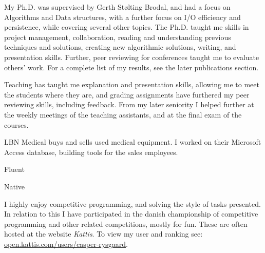 

My Ph.D. was supervised by Gerth Stølting Brodal, and had a focus on Algorithms and Data structures, with a further focus on I/O efficiency and persistence, while covering several other topics.
%
The Ph.D. taught me skills in project management, collaboration, reading and understanding previous techniques and solutions, creating new algorithmic solutions, writing, and presentation skills. Further, peer reviewing for conferences taught me to evaluate others' work.
For a complete list of my results, see the later publications section.

\divider

\vspace{-7pt}
\vspace{-7pt}

Teaching has taught me explanation and presentation skills, allowing me to meet the students where they are, and grading assignments have furthered my peer reviewing skills, including feedback.
%
From my later seniority I helped further at the weekly meetings of the teaching assistants, and at the final exam of the courses.

\divider

LBN Medical buys and sells used medical equipment. I worked on their Microsoft Access database, building tools for the sales employees.


\vspace{11pt}


Fluent

\divider

Native


\vspace{11pt}



I highly enjoy competitive programming, and solving the style of tasks presented.
In relation to this I have participated in the danish championship of competitive programming and other related competitions, mostly for fun.
These are often hosted at the website \emph{Kattis}.
To view my user and ranking see: \href{https://open.kattis.com/users/casper-rysgaard}{open.kattis.com/users/casper-rysgaard}.



